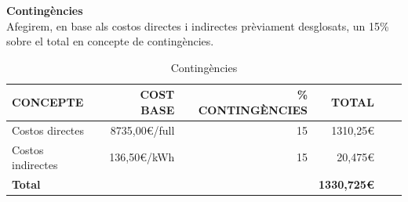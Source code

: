 \begin{table}[htb]
\centering
\label{PressupostIndirectes}
\caption{Costos indirectes i amortitzacions}
\end{table}


\noindent \textbf{\large Contingències}\\

\noindent Afegirem, en base als costos directes i indirectes prèviament desglosats, un 15\% sobre el total en concepte de contingències.

\begin{table}[htb]
\centering
\label{PressupostContingencies}
\begin{tabular}{lrrrrr}
\hline \textbf{CONCEPTE}                           & {\color[HTML]{000000} \textbf{COST BASE}} & {\color[HTML]{000000} \textbf{\% CONTINGÈNCIES}} & {\color[HTML]{000000} \textbf{TOTAL}}\\ 
\hline
Costos directes                             & 8735,00\euro /full                                           & 15                                             & 1310,25\euro\\
Costos indirectes                                 & 136,50\euro /kWh                                           & 15                                           & 20,475\euro\\
\hline
\textbf{Total}                               &                              &                                & \textbf{1330,725\euro}       \\
\hline                      
\end{tabular}%
\caption{Contingències}
\end{table}

